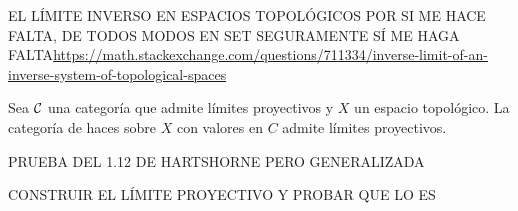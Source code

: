 \documentclass[twoside]{article}
\begin{document}
EL LÍMITE INVERSO EN ESPACIOS TOPOLÓGICOS POR SI ME HACE FALTA, DE TODOS MODOS EN SET SEGURAMENTE SÍ ME HAGA FALTA\url{https://math.stackexchange.com/questions/711334/inverse-limit-of-an-inverse-system-of-topological-spaces}

\begin{prop}[EGA, 3.2.6]\label{limite}
Sea ${\mathcal C}$ una categoría que admite límites proyectivos y $X$ un espacio topológico. La categoría de haces sobre $X$ con valores en $C$ admite límites proyectivos. 
\end{prop}
\begin{dem}
PRUEBA DEL 1.12 DE HARTSHORNE PERO GENERALIZADA
\end{dem}

\begin{ej}\label{set}
CONSTRUIR EL LÍMITE PROYECTIVO Y PROBAR QUE LO ES
\end{ej}
\end{document}
